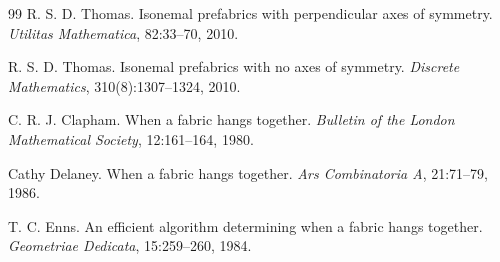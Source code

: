 \documentclass[11pt]{article}
\begin{document}
\begin{thebibliography}{99}
R. S. D. Thomas.
\newblock Isonemal prefabrics with perpendicular axes of symmetry.
\newblock \emph{Utilitas Mathematica}, 82:33--70, 2010.

R. S. D. Thomas.
\newblock Isonemal prefabrics with no axes of symmetry.
\newblock \emph{Discrete Mathematics}, 310(8):1307--1324, 2010.

C. R. J. Clapham.
\newblock When a fabric hangs together.
\newblock \emph{Bulletin of the London Mathematical Society}, 12:161--164,
1980.

Cathy Delaney.
\newblock When a fabric hangs together.
\newblock \emph{Ars Combinatoria A}, 21:71--79, 1986.

T. C. Enns.
\newblock An efficient algorithm determining when a fabric hangs together.
\newblock \emph{Geometriae Dedicata}, 15:259--260, 1984.

\end{thebibliography}
\end{document}

